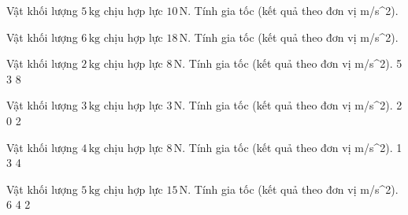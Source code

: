 \begin{bt}
Vật khối lượng $5\,\text{kg}$ chịu hợp lực $10\,\text{N}$. Tính gia tốc (kết quả theo đơn vị m/s^2).
\end{bt}

\begin{bt}
Vật khối lượng $6\,\text{kg}$ chịu hợp lực $18\,\text{N}$. Tính gia tốc (kết quả theo đơn vị m/s^2).
\end{bt}

\begin{ex}
Vật khối lượng $2\,\text{kg}$ chịu hợp lực $8\,\text{N}$. Tính gia tốc (kết quả theo đơn vị m/s^2).
\choice
{}
{5}
{3}
{8}
\end{ex}

\begin{ex}
Vật khối lượng $3\,\text{kg}$ chịu hợp lực $3\,\text{N}$. Tính gia tốc (kết quả theo đơn vị m/s^2).
\choice
{2}
{}
{0}
{2}
\end{ex}

\begin{ex}
Vật khối lượng $4\,\text{kg}$ chịu hợp lực $8\,\text{N}$. Tính gia tốc (kết quả theo đơn vị m/s^2).
\choice
{1}
{3}
{}
{4}
\end{ex}

\begin{ex}
Vật khối lượng $5\,\text{kg}$ chịu hợp lực $15\,\text{N}$. Tính gia tốc (kết quả theo đơn vị m/s^2).
\choice
{6}
{4}
{2}
{}
\end{ex}

